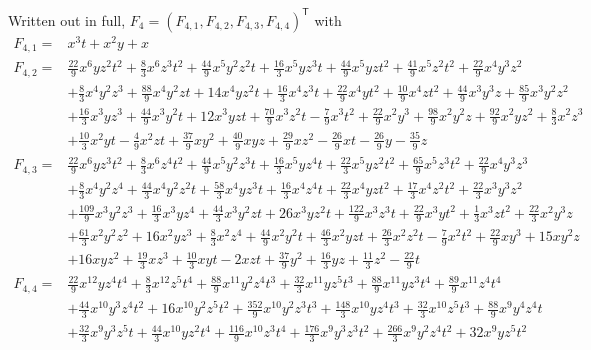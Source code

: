 \documentclass[11pt]{article}
\numberwithin{equation}{section}
\theoremstyle{plain}
\theoremstyle{definition}
\theoremstyle{remark}
\begin{document}
Written out in full, $F_4=(F_{4,1},F_{4,2},F_{4,3},F_{4,4})^{\mathsf T}$ with
{\small
\begin{align*}
F_{4,1} ={}& x^3t+x^2y+x\\[2pt]
F_{4,2} ={}&\tfrac{22}{9}x^6yz^2t^2+\tfrac{8}{3}x^6z^3t^2+\tfrac{44}{9}x^5y^2z^2t+\tfrac{16}{3}x^5yz^3t+\tfrac{44}{9}x^5yzt^2+\tfrac{41}{9}x^5z^2t^2+\tfrac{22}{9}x^4y^3z^2\\
&+\tfrac{8}{3}x^4y^2z^3+\tfrac{88}{9}x^4y^2zt+14x^4yz^2t+\tfrac{16}{3}x^4z^3t+\tfrac{22}{9}x^4yt^2+\tfrac{10}{9}x^4zt^2+\tfrac{44}{9}x^3y^3z+\tfrac{85}{9}x^3y^2z^2\\
&+\tfrac{16}{3}x^3yz^3+\tfrac{44}{9}x^3y^2t+12x^3yzt+\tfrac{70}{9}x^3z^2t-\tfrac{7}{9}x^3t^2+\tfrac{22}{9}x^2y^3+\tfrac{98}{9}x^2y^2z+\tfrac{92}{9}x^2yz^2+\tfrac{8}{3}x^2z^3\\
&+\tfrac{10}{3}x^2yt-\tfrac{4}{9}x^2zt+\tfrac{37}{9}xy^2+\tfrac{40}{9}xyz+\tfrac{29}{9}xz^2-\tfrac{26}{9}xt-\tfrac{26}{9}y-\tfrac{35}{9}z\\[2pt]
F_{4,3} ={}& \tfrac{22}{9}x^6yz^3t^2+\tfrac{8}{3}x^6z^4t^2+\tfrac{44}{9}x^5y^2z^3t+\tfrac{16}{3}x^5yz^4t+\tfrac{22}{3}x^5yz^2t^2+\tfrac{65}{9}x^5z^3t^2+\tfrac{22}{9}x^4y^3z^3\\
&+\tfrac{8}{3}x^4y^2z^4+\tfrac{44}{3}x^4y^2z^2t+\tfrac{58}{3}x^4yz^3t+\tfrac{16}{3}x^4z^4t+\tfrac{22}{3}x^4yzt^2+\tfrac{17}{3}x^4z^2t^2+\tfrac{22}{3}x^3y^3z^2\\
&+\tfrac{109}{9}x^3y^2z^3+\tfrac{16}{3}x^3yz^4+\tfrac{44}{3}x^3y^2zt+26x^3yz^2t+\tfrac{122}{9}x^3z^3t+\tfrac{22}{9}x^3yt^2+\tfrac{1}{3}x^3zt^2+\tfrac{22}{3}x^2y^3z\\
&+\tfrac{61}{3}x^2y^2z^2+16x^2yz^3+\tfrac{8}{3}x^2z^4+\tfrac{44}{9}x^2y^2t+\tfrac{46}{3}x^2yzt+\tfrac{26}{3}x^2z^2t-\tfrac{7}{9}x^2t^2+\tfrac{22}{9}xy^3+15xy^2z\\
&+16xyz^2+\tfrac{19}{3}xz^3+\tfrac{10}{3}xyt-2xzt+\tfrac{37}{9}y^2+\tfrac{16}{3}yz+\tfrac{11}{3}z^2-\tfrac{22}{9}t\\[2pt]
F_{4,4} ={}& \tfrac{22}{9}x^{12}yz^4t^4+\tfrac{8}{3}x^{12}z^5t^4+\tfrac{88}{9}x^{11}y^2z^4t^3+\tfrac{32}{3}x^{11}yz^5t^3+\tfrac{88}{9}x^{11}yz^3t^4+\tfrac{89}{9}x^{11}z^4t^4\\
&+\tfrac{44}{3}x^{10}y^3z^4t^2+16x^{10}y^2z^5t^2+\tfrac{352}{9}x^{10}y^2z^3t^3+\tfrac{148}{3}x^{10}yz^4t^3+\tfrac{32}{3}x^{10}z^5t^3+\tfrac{88}{9}x^9y^4z^4t\\
&+\tfrac{32}{3}x^9y^3z^5t+\tfrac{44}{3}x^{10}yz^2t^4+\tfrac{116}{9}x^{10}z^3t^4+\tfrac{176}{3}x^9y^3z^3t^2+\tfrac{266}{3}x^9y^2z^4t^2+32x^9yz^5t^2\\

\end{align*}}
\end{document}
